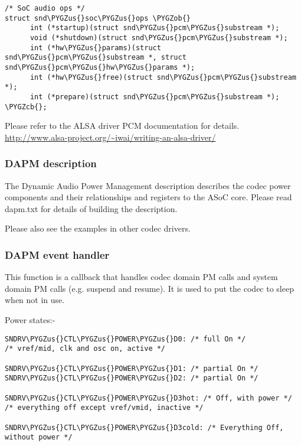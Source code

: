 \documentclass[a4paper,8pt,english]{sphinxmanual}
\def\PYGZus{\char`\_}
\def\PYGZob{\char`\{}
\def\PYGZcb{\char`\}}
\begin{document}
\begin{Verbatim}[commandchars=\\\{\}]
/* SoC audio ops */
struct snd\PYGZus{}soc\PYGZus{}ops \PYGZob{}
      int (*startup)(struct snd\PYGZus{}pcm\PYGZus{}substream *);
      void (*shutdown)(struct snd\PYGZus{}pcm\PYGZus{}substream *);
      int (*hw\PYGZus{}params)(struct snd\PYGZus{}pcm\PYGZus{}substream *, struct snd\PYGZus{}pcm\PYGZus{}hw\PYGZus{}params *);
      int (*hw\PYGZus{}free)(struct snd\PYGZus{}pcm\PYGZus{}substream *);
      int (*prepare)(struct snd\PYGZus{}pcm\PYGZus{}substream *);
\PYGZcb{};
\end{Verbatim}

Please refer to the ALSA driver PCM documentation for details.
\href{http://www.alsa-project.org/~iwai/writing-an-alsa-driver/}{http://www.alsa-project.org/\textasciitilde{}iwai/writing-an-alsa-driver/}


\subsubsection{DAPM description}
\label{sound/soc/codec:dapm-description}
The Dynamic Audio Power Management description describes the codec power
components and their relationships and registers to the ASoC core.
Please read dapm.txt for details of building the description.

Please also see the examples in other codec drivers.


\subsubsection{DAPM event handler}
\label{sound/soc/codec:dapm-event-handler}
This function is a callback that handles codec domain PM calls and system
domain PM calls (e.g. suspend and resume). It is used to put the codec
to sleep when not in use.

Power states:-

\begin{Verbatim}[commandchars=\\\{\}]
SNDRV\PYGZus{}CTL\PYGZus{}POWER\PYGZus{}D0: /* full On */
/* vref/mid, clk and osc on, active */

SNDRV\PYGZus{}CTL\PYGZus{}POWER\PYGZus{}D1: /* partial On */
SNDRV\PYGZus{}CTL\PYGZus{}POWER\PYGZus{}D2: /* partial On */

SNDRV\PYGZus{}CTL\PYGZus{}POWER\PYGZus{}D3hot: /* Off, with power */
/* everything off except vref/vmid, inactive */

SNDRV\PYGZus{}CTL\PYGZus{}POWER\PYGZus{}D3cold: /* Everything Off, without power */
\end{Verbatim}
\end{document}
